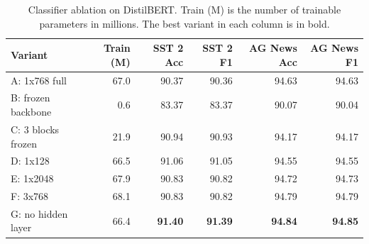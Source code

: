 \begin{table}[t]
\centering
\footnotesize
\caption{Classifier ablation on DistilBERT. Train (M) is the number of trainable parameters in millions. The best variant in each column is in bold.}
\label{tab:ablation}
\begin{tabular}{lrrrrr}
\toprule
Variant & Train (M) & SST 2 Acc & SST 2 F1 & AG News Acc & AG News F1 \\
\midrule
A: 1x768 full & 67.0 & 90.37 & 90.36 & 94.63 & 94.63 \\
B: frozen backbone & 0.6 & 83.37 & 83.37 & 90.07 & 90.04 \\
C: 3 blocks frozen & 21.9 & 90.94 & 90.93 & 94.17 & 94.17 \\
D: 1x128 & 66.5 & 91.06 & 91.05 & 94.55 & 94.55 \\
E: 1x2048 & 67.9 & 90.83 & 90.82 & 94.72 & 94.73 \\
F: 3x768 & 68.1 & 90.83 & 90.82 & 94.79 & 94.79 \\
G: no hidden layer & 66.4 & \textbf{91.40} & \textbf{91.39} & \textbf{94.84} & \textbf{94.85} \\
\bottomrule
\end{tabular}
\end{table}
